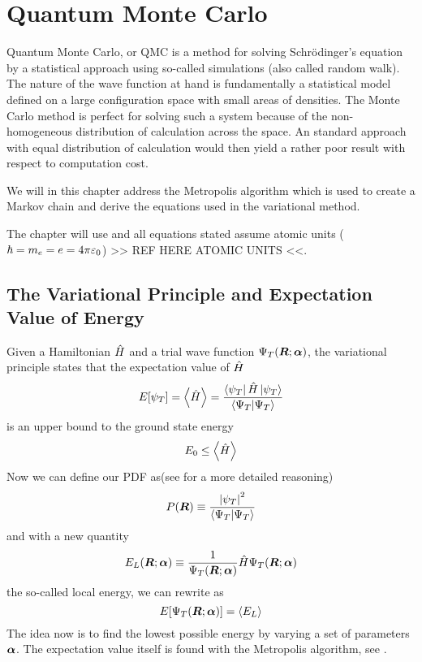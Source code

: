 \section{Quantum Monte Carlo\label{sec:QMC}}
    Quantum Monte Carlo, or QMC is a method for solving Schrödinger's equation
    by a statistical approach using so-called  simulations
    (also called random walk). The nature of the wave function at hand is
    fundamentally a statistical model defined on a large configuration space
    with small areas of densities. The Monte Carlo method is perfect for
    solving such a system because of the non-homogeneous distribution of
    calculation across the space. An standard approach with equal distribution
    of calculation would then yield a rather poor result with respect to
    computation cost.

    We will in this chapter address the Metropolis algorithm which is used to
    create a Markov chain and derive the equations used in the variational
    method.

    The chapter will use  \cite{GriffQuan} and all
    equations stated assume atomic units ($\hbar=m_e=e=4\pi\varepsilon_0$) >> REF
    HERE ATOMIC UNITS <<.

    \subsection{The Variational Principle and Expectation Value of Energy}
        Given a Hamiltonian $\hat{H}$ and a trial wave function ${\Psi}_T(\boldsymbol{{R}};\boldsymbol{{\alpha}})$, the
        variational principle \cite{GriffQuan, NeOr} states that the
        expectation value of $\hat{H}$
            \begin{equation}
                E[\psi_T] = \left< {\hat{H}} \right> =
                \frac{\bra{\psi_T}\hat{H}\ket{\psi_T}}{\bra{\Psi_T}\ket{\Psi_T}}
                \label{eq:ecpE}
            \end{equation}
        is an upper bound to the ground state energy
            \begin{equation}
                E_0 \leq \left< {\hat{H}} \right>
                \label{eq:ecpEBound}
            \end{equation}
        Now we can define our PDF as(see  for a more
        detailed reasoning)
            \begin{equation}
                P(\boldsymbol{{R}}) \equiv \frac{\abs{\psi_T}^2}{\bra{\Psi_T}\ket{\Psi_T}}
                \label{eq:PDFdef}
            \end{equation}
        and with a new quantity
            \begin{equation}
                E_L(\boldsymbol{{R}};\boldsymbol{{\alpha}}) \equiv \frac{1}{{\Psi}_T(\boldsymbol{{R}};\boldsymbol{{\alpha}})}\hat{H}{\Psi}_T(\boldsymbol{{R}};\boldsymbol{{\alpha}})
                \label{eq:ELdef}
            \end{equation}
        the so-called local energy, we can rewrite  as
            \begin{equation}
                E[{\Psi}_T(\boldsymbol{{R}};\boldsymbol{{\alpha}})] = \left< {E_L} \right>
            \end{equation}
        The idea now is to find the lowest possible energy by varying a set of
        parameters $\boldsymbol{{\alpha}}$. The expectation value itself is found with
        the Metropolis algorithm, see .

